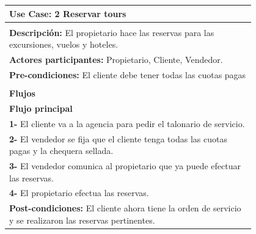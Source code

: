 \documentclass[12pt,a4paper,titlepage,oneside]{article}
\begin{document}
\begin{tabular}{| l | p{0.8\linewidth} |} \hline
	\multicolumn{2}{|p{0.8\linewidth}|}{\textbf{Use Case:} 2 Reservar tours} \\ \hline
	\multicolumn{2}{|c|}{} \\ \hline
	\multicolumn{2}{|p{0.8\linewidth}|}{\textbf{Descripci\'on:} El propietario hace las reservas para las excursiones, vuelos y hoteles.} \\ \hline
	\multicolumn{2}{|p{0.8\linewidth}|}{\textbf{Actores participantes:} Propietario, Cliente, Vendedor.} \\ \hline
	\multicolumn{2}{|p{0.8\linewidth}|}{\textbf{Pre-condiciones:} El cliente debe tener todas las cuotas pagas} \\ \hline
	\multicolumn{2}{|c|}{} \\ \hline
	\multicolumn{2}{|p{0.8\linewidth}|}{\textbf{Flujos}} \\ \hline
	\multicolumn{2}{|p{0.8\linewidth}|}{\textbf{Flujo principal}} \\ \hline
	\multicolumn{2}{|p{0.8\linewidth}|}{\textbf{1-} El cliente va a la agencia para pedir el talonario de servicio.} \\ \hline
	\multicolumn{2}{|p{0.8\linewidth}|}{\textbf{2-} El vendedor se fija que el cliente tenga todas las cuotas pagas y la chequera sellada.} \\ \hline
	\multicolumn{2}{|p{0.8\linewidth}|}{\textbf{3-} El vendedor comunica al propietario que ya puede efectuar las reservas.} \\ \hline
		\multicolumn{2}{|p{0.8\linewidth}|}{\textbf{4-} El propietario efectua las reservas.} \\ \hline
	\multicolumn{2}{|p{0.8\linewidth}|}{\textbf{Post-condiciones:} El cliente ahora tiene la orden de servicio y se realizaron las reservas pertinentes.}\\ \hline
\end{tabular} \\\\
 \\\\
\end{document}
